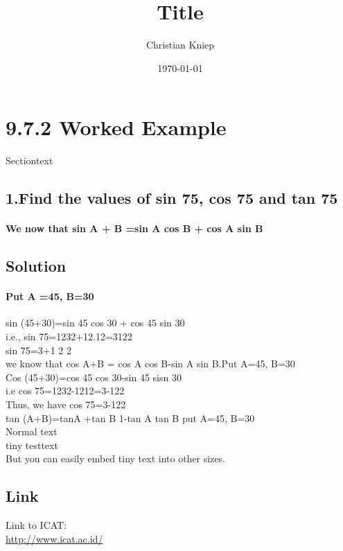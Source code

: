 \documentclass[11pt]{article}
\author{Christian Kniep}
\title{Title}
\date{\today}
\begin{document}
\maketitle
\section{9.7.2 Worked Example}

Sectiontext
\subsection{1.Find the values of sin 75, cos 75 and tan 75}
\paragraph{We now that sin A + B =sin A cos B + cos A sin B}
\subsection{Solution}
\paragraph{Put A =45, B=30}
sin (45+30)=sin 45 cos 30 + cos 45 sin 30 \\
i.e., sin 75=1232+12.12=3122 \\
sin 75=3+1 2 2 \\
we know that cos A+B = cos A cos B-sin A sin B.Put A=45, B=30 \\
Cos (45+30)=cos 45 cos 30-sin 45 sisn 30 \\
i.e cos 75=1232-1212=3-122 \\
Thus, we have cos 75=3-122\\
tan (A+B)=tanA +tan B 1-tan A tan B	put A=45, B=30\\
Normal text \\ %
\tiny           %
tiny testtext \\
\normalsize     %
But you can easily embed {\tiny tiny text} into other sizes.
\subsection{Link}
Link to ICAT: \\
\url{http://www.icat.ac.id/}
\end{document}

